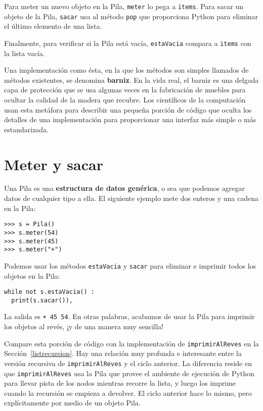 Para meter un nuevo objeto en la Pila, \texttt{meter} lo pega a \texttt{items}.
Para sacar un objeto de la Pila, \texttt{sacar} usa al método \texttt{pop}
que proporciona Python para eliminar el último elemento de una lista.

Finalmente, para verificar si la Pila está vacía, \texttt{estaVacia}
compara a \texttt{items} con la lista vacía.


Una implementación como ésta, en la que los métodos son simples llamados
de métodos existentes, se denomina \textbf{barniz}. En la vida real,
el barniz es una delgada capa de protección que se usa algunas veces
en la fabricación de muebles para ocultar la calidad de la madera
que recubre. Los científicos de la computación usan esta metáfora
para describir una pequeña porción de código que oculta los detalles
de una implementación para proporcionar una interfaz más simple o
más estandarizada.

\section{Meter y sacar}

  

Una Pila es una \textbf{estructura de datos genérica}, o sea que podemos
agregar datos de cualquier tipo a ella. El siguiente ejemplo mete
dos enteros y una cadena en la Pila:

\beforeverb 
\begin{verbatim}
>>> s = Pila()
>>> s.meter(54)
>>> s.meter(45)
>>> s.meter("+")
\end{verbatim}
\afterverb Podemos usar los métodos \texttt{estaVacia} y \texttt{sacar}
para eliminar e imprimir todos los objetos en la Pila:

\beforeverb 
\begin{verbatim}
while not s.estaVacia() :
  print(s.sacar()),
\end{verbatim}
\afterverb La salida es \texttt{+ 45 54}. En otras palabras, acabamos
de usar la Pila para imprimir los objetos al revés, ¡y de una manera
muy sencilla!

Compare esta porción de código con la implementación de \texttt{imprimirAlReves}
en la Sección~\ref{listrecursion}. Hay una relación muy profunda
e interesante entre la versión recursiva de \texttt{imprimirAlReves}
y el ciclo anterior. La diferencia reside en que \texttt{imprimirAlReves}
usa la Pila que provee el ambiente de ejecución de Python para llevar
pista de los nodos mientras recorre la lista, y luego los imprime
cuando la recursión se empieza a devolver. El ciclo anterior hace
lo mismo, pero explícitamente por medio de un objeto Pila.

